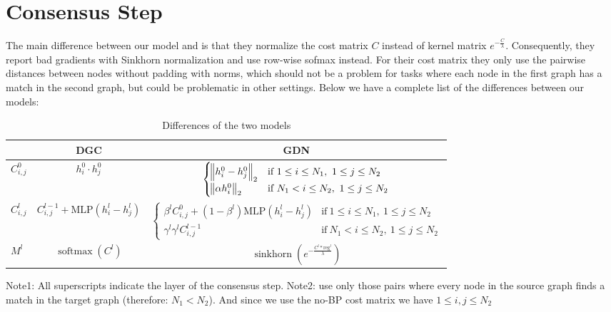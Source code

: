 \section{Consensus Step}
\label{appendix:consensus}

The main difference between our model and \cite{fey2020_update} is that they normalize the cost matrix $C$ instead of kernel matrix $e^{-\frac{C}{\lambda}}$. Consequently, they report bad gradients with Sinkhorn normalization and use row-wise sofmax instead. For their cost matrix they only use the pairwise distances between nodes without padding with norms, which should not be a problem for tasks where each node in the first graph has a match in the second graph, but could be problematic in other settings. Below we have a complete list of the differences between our models:


\begin{table}[htbp]
    \addtolength{\tabcolsep}{-1pt}
    \fontsize{9pt}{10.25pt}\selectfont
    \centering
    \renewcommand{\arraystretch}{1.2}
    \begin{tabular}{|C{1cm}|c|c|}
        \hline
        & DGC & GDN \\
        \hline
        $C^0_{i,j} $ & $h_i^0 \cdot h_j^0$ & $\begin{cases}
            \norm{h_i^0 - h_j^0}_2 & \text{if}\ 1 \leq i \leq N_1,\ 1 \leq j \leq N_2\\
            \norm{\alpha h_i^0}_2 & \text{if}\ N_1 < i \leq N_2,\ 1 \leq j \leq N_2
         \end{cases}$ \\
        $C^l_{i,j} $ & $C^{l - 1}_{i,j} + \text{MLP}(h_i^l - h_j^l)$ & $
        \begin{cases}
            \beta^l C^0_{i,j} + (1 - \beta^l) \text{MLP}(h_i^l - h_j^l) & \text{if}\ 1 \leq i \leq N_1,\ 1 \leq j \leq N_2\\
            \gamma^l \gamma^l C^{l - 1}_{i,j}  & \text{if}\ N_1 < i \leq N_2,\ 1 \leq j \leq N_2
        \end{cases}
        $ \\
        $M^l $ & $\operatorname{softmax}(C^l)$ & $\operatorname{sinkhorn}\left(e^{-\frac{C^l * \text{reg}^l}{\lambda}}\right)$ \\
        \hline
    \end{tabular}
    \caption{Differences of the two models}
    \label{tab:ex1-data}
\end{table}

Note1: All superscripts indicate the layer of the consensus step.
Note2: \cite{fey2020_update} use only those pairs where every node in the source graph finds a match in the target graph (therefore: $N_1 < N_2$). And since we use the no-BP cost matrix we have $1 \leq i, j \leq N_2$

